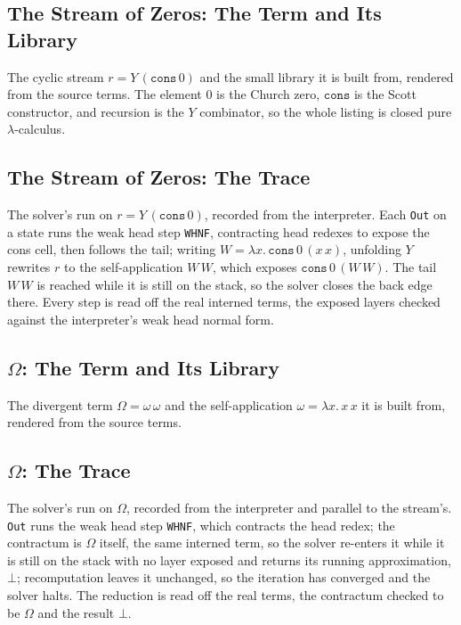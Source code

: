 \subsection{The Stream of Zeros: The Term and Its Library}\label{app:cyclic-zeros-code}
The cyclic stream $r = Y\,(\mathtt{cons}\,0)$ and the small library it is built from, rendered from the source terms. The element $0$ is the Church zero, $\mathtt{cons}$ is the Scott constructor, and recursion is the $Y$ combinator, so the whole listing is closed pure $\lambda$-calculus.


\subsection{The Stream of Zeros: The Trace}\label{app:cyclic-zeros-trace}
The solver's run on $r = Y\,(\mathtt{cons}\,0)$, recorded from the interpreter. Each \texttt{Out} on a state runs the weak head step \texttt{WHNF}, contracting head redexes to expose the cons cell, then follows the tail; writing $W = \lambda x.\,\mathtt{cons}\,0\,(x\,x)$, unfolding $Y$ rewrites $r$ to the self-application $W\,W$, which exposes $\mathtt{cons}\,0\,(W\,W)$. The tail $W\,W$ is reached while it is still on the stack, so the solver closes the back edge there. Every step is read off the real interned terms, the exposed layers checked against the interpreter's weak head normal form.


\subsection{$\Omega$: The Term and Its Library}\label{app:omega-code}
The divergent term $\Omega = \omega\,\omega$ and the self-application $\omega = \lambda x.\,x\,x$ it is built from, rendered from the source terms.


\subsection{$\Omega$: The Trace}\label{app:omega-trace}
The solver's run on $\Omega$, recorded from the interpreter and parallel to the stream's. \texttt{Out} runs the weak head step \texttt{WHNF}, which contracts the head redex; the contractum is $\Omega$ itself, the same interned term, so the solver re-enters it while it is still on the stack with no layer exposed and returns its running approximation, $\bot$; recomputation leaves it unchanged, so the iteration has converged and the solver halts. The reduction is read off the real terms, the contractum checked to be $\Omega$ and the result $\bot$.

\fi %





